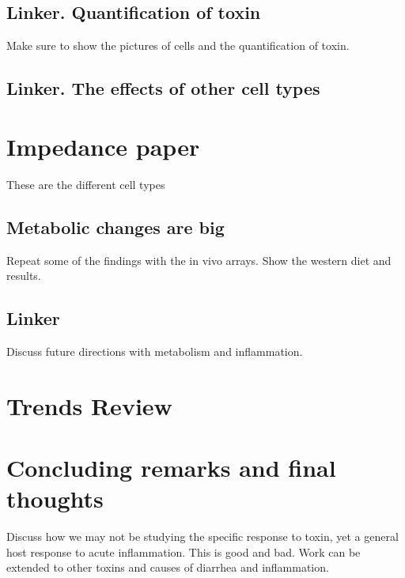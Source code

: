 \subsection{Linker. Quantification of toxin}
Make sure to show the pictures of cells and the quantification of toxin.

\subsection{Linker. The effects of other cell types}

\section{Impedance paper}
These are the different cell types

\subsection{Metabolic changes are big}
Repeat some of the findings with the in vivo arrays.
Show the western diet and results.

\subsection{Linker}
Discuss future directions with metabolism and inflammation.

\section{Trends Review}


\section{Concluding remarks and final thoughts}
Discuss how we may not be studying the specific response to toxin,
yet a general host response to acute inflammation. This is good and 
bad. Work can be extended to other toxins and causes of
diarrhea and inflammation.




